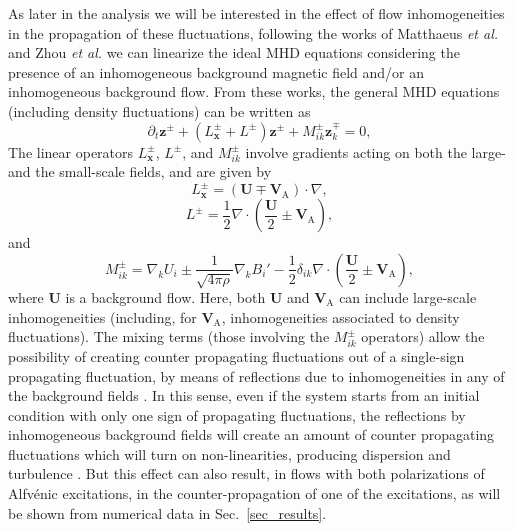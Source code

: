 \documentclass[aip,pop,reprint,amsmath,amssymb,floatfix]{revtex4-1}
\renewcommand{\vec}[1]{\mathbf{#1}}
\begin{document}
As later in the analysis we will be interested in the effect of flow inhomogeneities in the propagation of these fluctuations, following 
the works of Matthaeus {\it et al.} \cite{matthaeus1994transport} 
and Zhou {\it et al.} \cite{zhou1990remarks} we can linearize the 
ideal MHD equations considering the presence of an inhomogeneous 
background magnetic field and/or an inhomogeneous background flow. From 
these works, the general MHD equations (including density fluctuations) 
can be written as
\begin{equation}\label{eq:MHD_zpzm}
  \partial_t \vec{z}^\pm
  + \left( L^\pm_\vec{x} + L^\pm \right) \vec{z}^\pm
  + M^\pm_{ik} \vec{z}^\mp_k
  = 0,
\end{equation}
The linear operators $L^\pm_\vec{x}$, $L^\pm$, and $M^\pm_{ik}$
involve gradients acting on both the large- and the small-scale
fields, and are given by
\begin{equation}\label{eq:MHD_Lx}
  L^\pm_\vec{x} = \left( \vec{U} \mp \vec{V}_\textrm{A} \right) \cdot \nabla ,
\end{equation}
\begin{equation}\label{eq:MHD_L}
  L^\pm = \frac{1}{2} \nabla \cdot \left( \frac{\vec{U}}{2} \pm \vec{V}_\textrm{A} 
  \right) ,
\end{equation}
and
\begin{equation}\label{eq:MHD_Mik}
  M^\pm_{ik} = \nabla_k U_i \pm \frac{1}{\sqrt{4\pi\rho}} \nabla_k B_i'
  - \frac{1}{2} \delta_{ik} \nabla\cdot \left( \frac{\vec{U}}{2} \pm
  \vec{V}_\textrm{A} \right) ,
\end{equation}
where $\vec{U}$ is a background flow. Here, both $\vec{U}$ and
$\vec{V}_\textrm{A}$ can include large-scale inhomogeneities
(including, for $\vec{V}_\textrm{A}$, inhomogeneities associated to
density fluctuations). The mixing terms (those involving the
$M_{ik}^\pm$ operators) allow the possibility of creating counter
propagating fluctuations out of a single-sign propagating fluctuation,
by means of reflections due to inhomogeneities in any of the
background fields \cite{velli_1993_propagation}. In this sense, even
if the system starts from an initial condition with only one sign of
propagating fluctuations, the reflections by inhomogeneous background
fields will create an amount of counter propagating fluctuations which
will turn on non-linearities, producing dispersion and turbulence
\cite{matthaeus_1999_coronal, dmitruk_2001_coronal}. But this effect
can also result, in flows with both polarizations of Alfv\'enic
excitations, in the counter-propagation of one of the excitations, as
will be shown from numerical data in Sec.~\ref{sec_results}.
\end{document}
